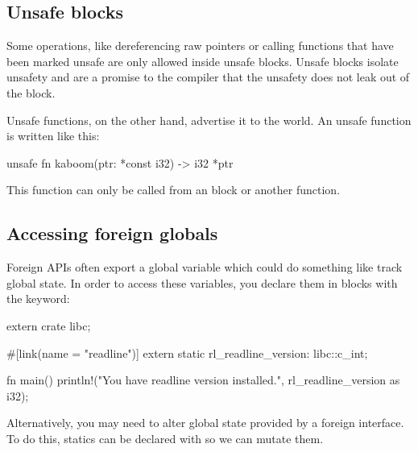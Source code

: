 \subsection*{Unsafe blocks}

Some operations, like dereferencing raw pointers or calling functions that have been marked unsafe are only allowed 
inside unsafe blocks. Unsafe blocks isolate unsafety and are a promise to the compiler that the unsafety does not leak 
out of the block.

\blank

Unsafe functions, on the other hand, advertise it to the world. An unsafe function is written like this:

\begin{rustc}
unsafe fn kaboom(ptr: *const i32) -> i32 { *ptr }
\end{rustc}

This function can only be called from an  block or another  function.

\subsection*{Accessing foreign globals}

Foreign APIs often export a global variable which could do something like track global state. In order to access these 
variables, you declare them in  blocks with the  keyword:

\begin{rustc}
extern crate libc;

#[link(name = "readline")]
extern {
    static rl_readline_version: libc::c_int;
}

fn main() {
    println!("You have readline version {} installed.",
             rl_readline_version as i32);
}
\end{rustc}

Alternatively, you may need to alter global state provided by a foreign interface. To do this, statics can be declared 
with  so we can mutate them.


